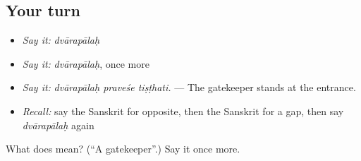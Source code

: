 \subsection*{Your turn}
\begin{itemize}
\raggedright
  \item \emph{Say it:} \emph{dvārapālaḥ}
  \item \emph{Say it:} \emph{dvārapālaḥ}, once more
  \item \emph{Say it:} \emph{dvārapālaḥ praveśe tiṣṭhati.} — The gatekeeper stands at the entrance.
  \item \emph{Recall:} say the Sanskrit for opposite, then the Sanskrit for a gap, then say \emph{dvārapālaḥ} again
\end{itemize}

\begin{tcolorbox}[breakable,colback=teal!4,colframe=teal!35!black,title={Before you move on}]
What does  mean? (\textquotedblleft{}A gatekeeper\textquotedblright{}.) Say it once more.
\end{tcolorbox}
